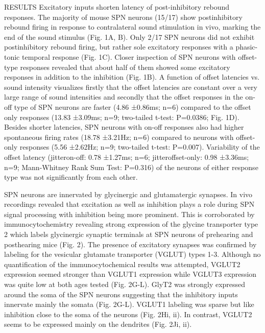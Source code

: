\documentclass{article}
\begin{document}
RESULTS
Excitatory inputs shorten latency of post-inhibitory rebound responses.
The majority of mouse SPN neurons (15/17) show postinhibitory rebound firing in response to contralateral sound stimulation in vivo, marking the end of the sound stimulus (Fig. 1A, B). Only 2/17 SPN neurons did not exhibit postinhibitory rebound firing, but rather sole excitatory responses with a phasic-tonic temporal response (Fig. 1C). Closer inspection of SPN neurons with offset-type responses revealed that about half of them showed some excitatory responses in addition to the inhibition (Fig. 1B). A function of offset latencies vs. sound intensity visualizes firstly that the offset latencies are constant over a very large range of sound intensities and secondly that the offset responses in the on-off type of SPN neurons are faster (4.86 ±0.86ms; n=6) compared to the offset only responses (13.83 ±3.09ms; n=9; two-tailed t-test: P=0.0386; Fig. 1D). Besides shorter latencies, SPN neurons with on-off responses also had higher spontaneous firing rates (18.78 ±3.21Hz; n=6) compared to neurons with offset-only responses (5.56 ±2.62Hz; n=9; two-tailed t-test: P=0.007). Variability of the offset latency (jitteron-off: 0.78 ±1.27ms; n=6; jitteroffset-only: 0.98 ±3.36ms; n=9; Mann-Whitney Rank Sum Test: P=0.316) of the neurons of either response type was not significantly from each other. 

SPN neurons are innervated by glycinergic and glutamatergic synapses.
In vivo recordings revealed that excitation as well as inhibition plays a role during SPN signal processing with inhibition being more prominent. This is corroborated by immunocytochemistry revealing strong expression of the glycine transporter type 2 which labels glycinergic synaptic terminals at SPN neurons of prehearing and posthearing mice (Fig. 2). The presence of excitatory synapses was confirmed by labeling for the vesicular glutamate transporter (VGLUT) types 1-3. Although no quantification of the immunocytochemical results was attempted, VGLUT2 expression seemed stronger than VGLUT1 expression while VGLUT3 expression was quite low at both ages tested (Fig. 2G-L). GlyT2 was strongly expressed around the soma of the SPN neurons suggesting that the inhibitory inputs innervate mainly the somata (Fig. 2G-L). VGLUT1 labeling was sparse but like inhibition close to the soma of the neurons (Fig. 2Hi, ii). In contrast, VGLUT2 seems to be expressed mainly on the dendrites (Fig. 2Ji, ii).
\end{document}
